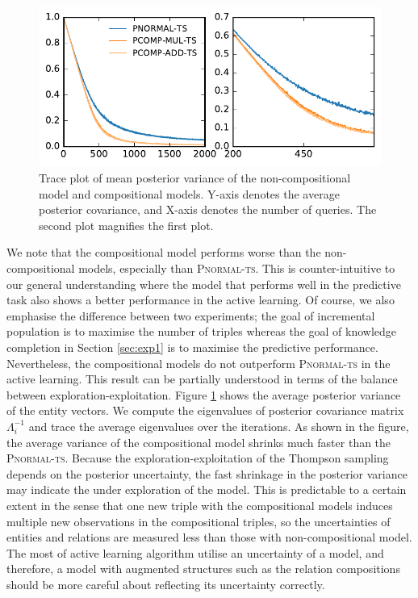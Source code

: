\begin{figure}[t]
	\centering


	\includegraphics[width=0.9\linewidth]{images/posterior_variance_trace_kinship.pdf}

	\caption{\label{fig:pos_var} Trace plot of mean posterior variance of the non-compositional model and compositional models. Y-axis denotes the average posterior covariance, and X-axis denotes the number of queries. The second plot magnifies the first plot.}
\end{figure}

We note that the compositional model performs worse than the non-compositional models,
especially than \textsc{Pnormal-ts}.
This is counter-intuitive to our general understanding where
the model that performs well in the predictive task also shows
a better performance in the active learning.
Of course, we also emphasise the difference between two experiments;
the goal of incremental population is to maximise the number of triples
whereas the goal of knowledge completion in Section \ref{sec:exp1} is to maximise
the predictive performance. Nevertheless, the compositional models do not outperform
\textsc{Pnormal-ts} in the active learning.
This result can be partially understood in terms of the balance between
exploration-exploitation. Figure \ref{fig:pos_var} shows the average posterior variance of
the entity vectors. We compute the eigenvalues of posterior covariance matrix $\Lambda_i^{-1}$
and trace the average eigenvalues over the iterations.
As shown in the figure, the average variance of the compositional model shrinks much faster
than the \textsc{Pnormal-ts}. Because the exploration-exploitation of the Thompson sampling depends on the
posterior uncertainty, the fast shrinkage in the posterior variance may indicate the under
exploration of the model. This is predictable to a certain extent in the sense that one new triple with the compositional models induces multiple new
observations in the compositional triples, so the uncertainties of entities and
relations are measured less than those with non-compositional model. The most of active
learning algorithm utilise an uncertainty of a model, and therefore, a model with augmented
structures such as the relation compositions should be more careful about reflecting its uncertainty correctly.


